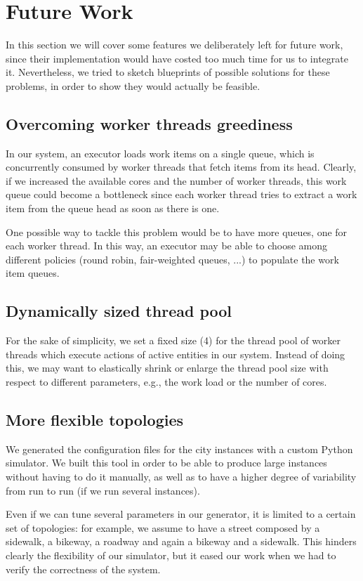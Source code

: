 \section{Future Work}
In this section we will cover some features we deliberately left for future
work, since their implementation would have costed too much time for us to
integrate it.
Nevertheless, we tried to sketch blueprints of possible solutions for these
problems, in order to show they would actually be feasible.

\subsection{Overcoming worker threads greediness}
In our system, an executor loads work items on a single queue, which is
concurrently consumed by worker threads that fetch items from its head.
Clearly, if we increased the available cores and the number of worker threads,
this work queue could become a bottleneck since each worker thread tries to
extract a work item from the queue head as soon as there is one.

One possible way to tackle this problem would be to have more queues, one for
each worker thread. In this way, an executor may be able to choose among
different policies (round robin, fair-weighted queues, ...) to populate the
work item queues.

\subsection{Dynamically sized thread pool}
For the sake of simplicity, we set a fixed size (4) for the thread pool of
worker threads which execute actions of active entities in our system.
Instead of doing this, we may want to elastically shrink or enlarge the thread
pool size with respect to different parameters, e.g., the work load or the
number of cores.

\subsection{More flexible topologies}
We generated the configuration files for the city instances with a custom
Python simulator. We built this tool in order to be able to produce large
instances without having to do it manually, as well as to have a higher degree
of variability from run to run (if we run several instances).

Even if we can tune several parameters in our generator, it is limited to a
certain set of topologies: for example, we assume to have a street composed by
a sidewalk, a bikeway, a roadway and again a bikeway and a sidewalk.
This hinders clearly the flexibility of our simulator, but it eased our work
when we had to verify the correctness of the system.

